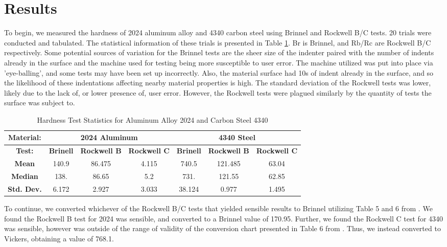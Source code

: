 \documentclass{article}
\begin{document}
\newpage
\section{Results}
To begin, we measured the hardness of 2024 aluminum alloy and 4340 carbon steel using Brinnel and Rockwell B/C tests. 20 trials were conducted and tabulated. The statistical information of these trials is presented in Table \ref{table:q1}. Br is Brinnel, and Rb/Rc are Rockwell B/C respectively. Some potential sources of variation for the Brinnel tests are the sheer size of the indenter paired with the number of indents already in the surface and the machine used for testing being more susceptible to user error. The machine utilized was put into place via 'eye-balling', and some tests may have been set up incorrectly. Also, the material surface had 10s of indent already in the surface, and so the likelihood of these indentations affecting nearby material properties is high. The standard deviation of the Rockwell tests was lower, likely due to the lack of, or lower presence of, user error. However, the Rockwell tests were plagued similarly by the quantity of tests the surface was subject to. 

\begin{table}[!hp]
    \def\arraystretch{1.5}
    \centering
    \caption{Hardness Test Statistics for Aluminum Alloy 2024 and Carbon Steel 4340}
    \label{table:q1}
    \begin{tabular}{|c|c|c|c|c|c|c|}
    \toprule
    \hline
    \multicolumn{1}{|c|}{\textbf{Material:}} & \multicolumn{3}{|c|}{\textbf{2024 Aluminum}} & \multicolumn{3}{|c|}{\textbf{4340 Steel}} \\ \hline
    \textbf{Test:} & \textbf{Brinell} & \textbf{Rockwell B} & \textbf{Rockwell C} & \textbf{Brinell} & \textbf{Rockwell B} & \textbf{Rockwell C} \\ 
    \midrule
    \textbf{Mean} & 140.9 & 86.475 & 4.115 & 740.5 & 121.485 & 63.04 \\
    \textbf{Median} & 138. & 86.65 & 5.2 & 731. & 121.55 & 62.85 \\
    \textbf{Std. Dev.} & 6.172 & 2.927 & 3.033 & 38.124 & 0.977 & 1.495 \\
    \hline
\end{tabular}
\end{table} 

To continue, we converted whichever of the Rockwell B/C tests that yielded sensible results to Brinnel utilizing Table 5 and 6 from \cite{manual}. We found the Rockwell B test for 2024 was sensible, and converted to a Brinnel value of 170.95. Further, we found the Rockwell C test for 4340 was sensible, however was outside of the range of validity of the conversion chart presented in Table 6 from \cite{manual}. Thus, we instead converted to Vickers, obtaining a value of 768.1.
\end{document}
